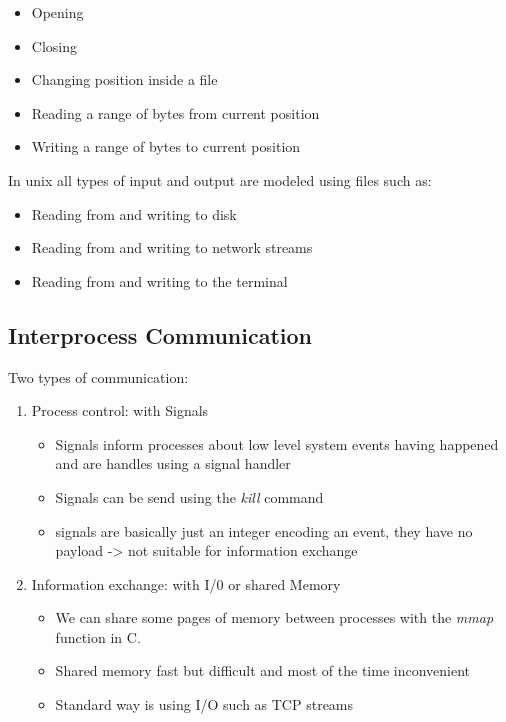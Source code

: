    \begin{itemize}
        \item Opening
        \item Closing
        \item Changing position inside a file
        \item Reading a range of bytes from current position
        \item Writing a range of bytes to current position
    \end{itemize}

    In unix all types of input and output are modeled using files such as:
    \begin{itemize}
        \item Reading from and writing to disk
        \item Reading from and writing to network streams
        \item Reading from and writing to the terminal
    \end{itemize}

    \subsection{Interprocess Communication}

    Two types of communication:

    \begin{enumerate}
        \item Process control: with Signals
              \begin{itemize}
                  \item Signals inform processes about low level system events having happened and are handles using a signal handler
                  \item Signals can be send using the \textit{kill} command
                  \item signals are basically just an integer encoding an event, they have no payload -> not suitable for information exchange
              \end{itemize}
        \item Information exchange: with I/0 or shared Memory
              \begin{itemize}
                  \item We can share some pages of memory between processes with the \textit{mmap} function in C.
                  \item Shared memory fast but difficult and most of the time inconvenient
                  \item Standard way is using I/O such as TCP streams
              \end{itemize}
    \end{enumerate}

